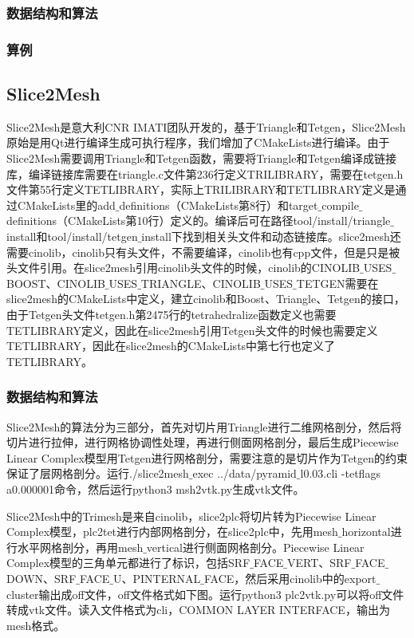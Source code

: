 \subsubsection{数据结构和算法}

\subsubsection{算例}

\subsection{Slice2Mesh}

Slice2Mesh是意大利CNR IMATI团队开发的，基于Triangle和Tetgen，Slice2Mesh原始是用Qt进行编译生成可执行程序，我们增加了CMakeLists进行编译。由于Slice2Mesh需要调用Triangle和Tetgen函数，需要将Triangle和Tetgen编译成链接库，编译链接库需要在triangle.c文件第236行定义TRILIBRARY，需要在tetgen.h文件第55行定义TETLIBRARY，实际上TRILIBRARY和TETLIBRARY定义是通过CMakeLists里的add$\_$definitions（CMakeLists第8行）和target$\_$compile$\_$definitions（CMakeLists第10行）定义的。编译后可在路径tool/install/triangle$\_$install和tool/install/tetgen$\_$install下找到相关头文件和动态链接库。slice2mesh还需要cinolib，cinolib只有头文件，不需要编译，cinolib也有cpp文件，但是只是被头文件引用。在slice2mesh引用cinolib头文件的时候，cinolib的CINOLIB$\_$USES$\_$BOOST、CINOLIB$\_$USES$\_$TRIANGLE、CINOLIB$\_$USES$\_$TETGEN需要在slice2mesh的CMakeLists中定义，建立cinolib和Boost、Triangle、Tetgen的接口，由于Tetgen头文件tetgen.h第2475行的tetrahedralize函数定义也需要TETLIBRARY定义，因此在slice2mesh引用Tetgen头文件的时候也需要定义TETLIBRARY，因此在slice2mesh的CMakeLists中第七行也定义了TETLIBRARY。

\subsubsection{数据结构和算法}

Slice2Mesh的算法分为三部分，首先对切片用Triangle进行二维网格剖分，然后将切片进行拉伸，进行网格协调性处理，再进行侧面网格剖分，最后生成Piecewise Linear Complex模型用Tetgen进行网格剖分，需要注意的是切片作为Tetgen的约束保证了层网格剖分。运行./slice2mesh$\_$exec ../data/pyramid$\_$l0.03.cli -tetflags a0.000001命令，然后运行python3 msh2vtk.py生成vtk文件。

Slice2Mesh中的Trimesh是来自cinolib，slice2plc将切片转为Piecewise Linear Complex模型，plc2tet进行内部网格剖分，在slice2plc中，先用mesh$\_$horizontal进行水平网格剖分，再用mesh$\_$vertical进行侧面网格剖分。Piecewise Linear Complex模型的三角单元都进行了标识，包括SRF$\_$FACE$\_$VERT、SRF$\_$FACE$\_$DOWN、SRF$\_$FACE$\_$U、PINTERNAL$\_$FACE，然后采用cinolib中的export$\_$cluster输出成off文件，off文件格式如下图。运行python3 plc2vtk.py可以将off文件转成vtk文件。读入文件格式为cli，COMMON LAYER INTERFACE，输出为mesh格式。

